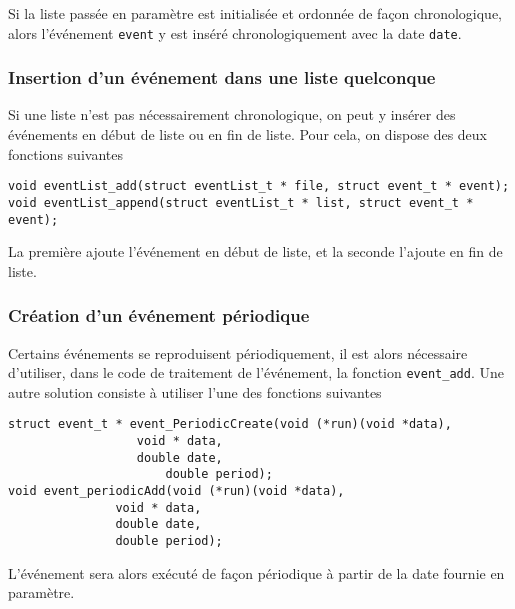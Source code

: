    Si la liste passée en paramètre est initialisée et ordonnée de
façon chronologique, alors l'événement \lstinline!event! y est inséré
chronologiquement avec la date \lstinline!date!.

%
\subsubsection{Insertion d'un événement dans une liste quelconque}

   Si une liste n'est pas nécessairement chronologique, on peut y
insérer des événements en début de liste ou en fin de liste. Pour
cela, on dispose des deux fonctions suivantes

\begin{verbatim}
void eventList_add(struct eventList_t * file, struct event_t * event);
void eventList_append(struct eventList_t * list, struct event_t * event);
\end{verbatim}

  La première ajoute l'événement en début de liste, et la seconde
l'ajoute en fin de liste.

%
\subsubsection{Création d'un événement périodique}

   Certains événements se reproduisent périodiquement, il est alors
nécessaire d'utiliser, dans le code de traitement de l'événement, la
fonction {\tt event\_add}. Une autre solution consiste à utiliser
l'une des fonctions suivantes 

\begin{verbatim}
struct event_t * event_PeriodicCreate(void (*run)(void *data),
			      void * data,
			      double date,
		              double period);
void event_periodicAdd(void (*run)(void *data),
		       void * data,
		       double date,
		       double period);

\end{verbatim}

   L'événement sera alors exécuté de façon périodique à partir de la
date fournie en paramètre.

